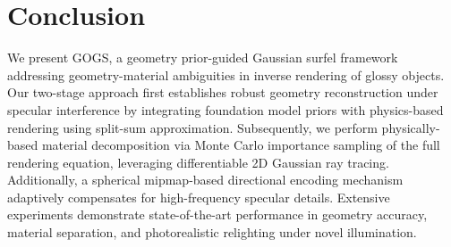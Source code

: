 \section{Conclusion}
\label{sec:conc}
We present GOGS, a geometry prior-guided Gaussian surfel framework addressing geometry-material ambiguities in inverse rendering of glossy objects. Our two-stage approach first establishes robust geometry reconstruction under specular interference by integrating foundation model priors with physics-based rendering using split-sum approximation. Subsequently, we perform physically-based material decomposition via Monte Carlo importance sampling of the full rendering equation, leveraging differentiable 2D Gaussian ray tracing. Additionally, a spherical mipmap-based directional encoding mechanism adaptively compensates for high-frequency specular details. Extensive experiments demonstrate state-of-the-art performance in geometry accuracy, material separation, and photorealistic relighting under novel illumination.